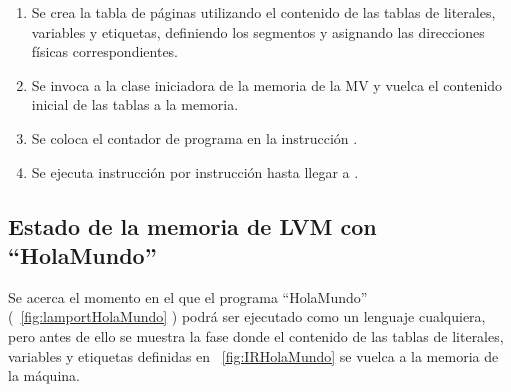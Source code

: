 \begin{enumerate}
    \item Se crea la tabla de páginas utilizando el contenido de las tablas de literales, variables y etiquetas, definiendo los segmentos y asignando las direcciones físicas correspondientes.
    \item Se invoca a la clase iniciadora de la memoria de la MV y vuelca el contenido inicial de las tablas a la memoria.
    \item Se coloca el contador de programa en la instrucción .
    \item Se ejecuta instrucción por instrucción hasta llegar a .
\end{enumerate}

\subsection{Estado de la memoria de LVM con ``HolaMundo''}
Se acerca el momento en el que el programa ``HolaMundo'' (~\ref{fig:lamportHolaMundo} ) podrá ser ejecutado como un lenguaje cualquiera, pero antes de ello se muestra la fase donde el contenido de las tablas de literales, variables y etiquetas definidas en ~\ref{fig:IRHolaMundo} se vuelca a la memoria de la máquina.

